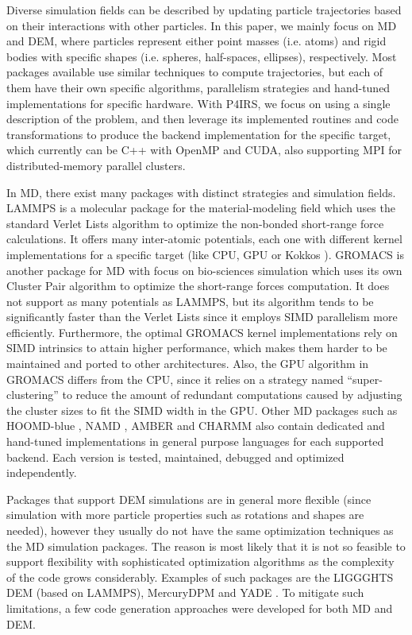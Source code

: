 \documentclass[preprint,12pt]{elsarticle}
\begin{document}
Diverse simulation fields can be described by updating particle trajectories based on their interactions with other particles.
In this paper, we mainly focus on \ac{MD} and \ac{DEM}, where particles represent either point masses (i.e. atoms) and rigid bodies with specific shapes (i.e. spheres, half-spaces, ellipses), respectively.
Most packages available use similar techniques to compute trajectories, but each of them have their own specific algorithms, parallelism strategies and hand-tuned implementations for specific hardware.
With P4IRS, we focus on using a single description of the problem, and then leverage its implemented routines and code transformations to produce the backend implementation for the specific target, which currently can be C++ with OpenMP and CUDA, also supporting MPI for distributed-memory parallel clusters.

In MD, there exist many packages with distinct strategies and simulation fields.
LAMMPS \cite{lammps1,lammps2} is a molecular package for the material-modeling field which uses the standard Verlet Lists algorithm to optimize the non-bonded short-range force calculations.
It offers many inter-atomic potentials, each one with different kernel implementations for a specific target (like CPU, GPU or Kokkos \cite{kokkos}).
GROMACS \cite{gromacs1,gromacs2} is another package for MD with focus on bio-sciences simulation which uses its own Cluster Pair algorithm to optimize the short-range forces computation.
It does not support as many potentials as LAMMPS, but its algorithm tends to be significantly faster than the Verlet Lists since it employs SIMD parallelism more efficiently.
Furthermore, the optimal GROMACS kernel implementations rely on SIMD intrinsics to attain higher performance, which makes them harder to be maintained and ported to other architectures.
Also, the GPU algorithm in GROMACS differs from the CPU, since it relies on a strategy named ``super-clustering'' to reduce the amount of redundant computations caused by adjusting the cluster sizes to fit the SIMD width in the GPU.
Other MD packages such as HOOMD-blue \cite{hoomdblue}, NAMD \cite{namd}, AMBER \cite{amber1,amber2} and CHARMM \cite{charmm} also contain dedicated and hand-tuned implementations in general purpose languages for each supported backend.
Each version is tested, maintained, debugged and optimized independently.

Packages that support DEM simulations are in general more flexible (since simulation with more particle properties such as rotations and shapes are needed), however they usually do not have the same optimization techniques as the MD simulation packages.
The reason is most likely that it is not so feasible to support flexibility with sophisticated optimization algorithms as the complexity of the code grows considerably.
Examples of such packages are the LIGGGHTS DEM \cite{liggghts} (based on LAMMPS), MercuryDPM \cite{mercurydpm} and YADE \cite{yade}.
To mitigate such limitations, a few code generation approaches were developed for both MD and DEM.
\end{document}
